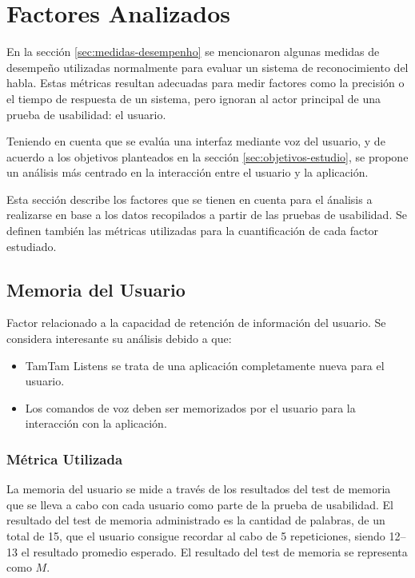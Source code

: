 \section{Factores Analizados}
\label{sec:factores}

En la secci\'on \ref{sec:medidas-desempenho} se mencionaron algunas medidas de desempe\~no 
utilizadas normalmente para evaluar un sistema de reconocimiento del habla. Estas m\'etricas
resultan adecuadas para medir factores como la precisi\'on o el tiempo de respuesta de un
sistema, pero ignoran al actor principal de una prueba de usabilidad: el usuario.

Teniendo en cuenta que se eval\'ua una interfaz mediante voz del usuario, y de acuerdo a los
objetivos planteados en la secci\'on \ref{sec:objetivos-estudio}, se propone un an\'alisis m\'as
centrado en la interacci\'on entre el usuario y la aplicaci\'on.

Esta secci\'on describe los factores que se tienen en cuenta para el \'analisis a realizarse
en base a los datos recopilados a partir de las pruebas de usabilidad.
Se definen tambi\'en las m\'etricas utilizadas para la cuantificaci\'on de cada factor estudiado.

\subsection{Memoria del Usuario}
\label{sec:memoria-del-usuario}
Factor relacionado a la capacidad de retenci\'on de informaci\'on del usuario.
Se considera interesante su an\'alisis debido a que:
\begin{itemize}
	\item TamTam Listens se trata de una aplicaci\'on completamente nueva para el usuario.
	\item Los comandos de voz deben ser memorizados por el usuario para la interacci\'on con
	la aplicaci\'on.
\end{itemize}
\subsubsection{M\'etrica Utilizada}
La memoria del usuario se mide a trav\'es de los resultados del test de memoria que se lleva
a cabo con cada usuario como parte de la prueba de usabilidad.
El resultado del test de memoria administrado es la cantidad de palabras, de un total de 15,
que el usuario consigue recordar al cabo de 5 repeticiones, siendo 12--13 el resultado promedio
esperado. El resultado del test de memoria se representa como $M$.

